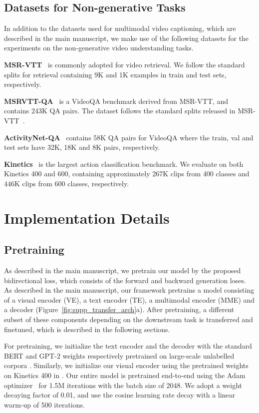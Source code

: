 \documentclass[10pt,twocolumn,letterpaper]{article}
\begin{document}
\subsection{Datasets for Non-generative Tasks}
In addition to the datasets used for multimodal video captioning, which are described in the main manuscript, we make use of the following datasets for the experiments on the non-generative video understanding tasks.

\noindent\textbf{MSR-VTT}~\cite{xu2016msr} is commonly adopted for video retrieval. We follow the standard splits for retrieval \cite{yu2018joint} containing 9K and 1K examples in train and test sets, respectively.

\noindent\textbf{MSRVTT-QA}~\cite{xu2017video} is a VideoQA benchmark derived from MSR-VTT, and contains 243K QA pairs. The dataset follows the standard splits released in MSR-VTT~\cite{xu2016msr}.

\noindent\textbf{ActivityNet-QA}~\cite{yu2019activitynet} contains 58K QA pairs for VideoQA where the train, val and test sets have 32K, 18K and 8K pairs, respectively. 

\noindent\textbf{Kinetics}~\cite{kay2017kinetics} is the largest action classification benchmark.
We evaluate on both Kinetics 400 and 600, containing approximately 267K clips from 400 classes and 446K clips from 600 classes, respectively.

\section{Implementation Details} \label{sec:supp-impl-details}

\subsection{Pretraining}
As described in the main manuscript, we pretrain our model by the proposed bidirectional loss, which consists of the forward and backward generation loses.
As described in the main manuscript, our framework pretrains a model consisting of a visual encoder (VE), a text encoder (TE), a multimodal encoder (MME) and a decoder (Figure~\ref{fig:supp_transfer_arch}a).
After pretraining, a different subset of these components depending on the downstream task is transferred and finetuned, which is described in the following sections.

For pretraining, we initialize the text encoder and the decoder with the standard BERT and GPT-2 weights respectively pretrained on large-scale unlabelled corpora \cite{devlin2018bert,radford2019language}.
Similarly, we initialize our visual encoder using the pretrained weights on Kinetics 400 in \cite{arnab2021vivit}. Our entire model is pretrained end-to-end using the Adam optimizer~\cite{kingma2014adam} for 1.5M iterations with the batch size of 2048. We adopt a weight decaying factor of 0.01, and use the cosine learning rate decay with a linear warm-up of 500 iterations.
\end{document}
